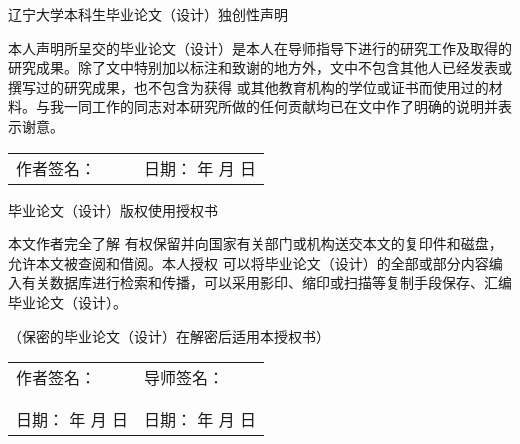 {
  \setlength{\parindent}{0em}
  \linespread{1}

  \vspace*{0.6em}

  {
    \centering
    \songti\xiaoer
    辽宁大学本科生毕业论文（设计）独创性声明 \par
  }

  \vspace{3.1em}

  {
    \setlength{\parindent}{2em}
    \linespread{1.6}
    \songti\xiaosi
    本人声明所呈交的毕业论文（设计）是本人在导师指导下进行的研究工作及取得的研究成果。除了文中特别加以标注和致谢的地方外，文中不包含其他人已经发表或撰写过的研究成果，也不包含为获得 \underline{\kaiti\sihao\bfseries {}} 或其他教育机构的学位或证书而使用过的材料。与我一同工作的同志对本研究所做的任何贡献均已在文中作了明确的说明并表示谢意。 \par
  }

  \vspace{2.9em}

  {
    \songti\xiaosi
    \begin{tabular}{@{} p{0.5\linewidth} p{0.5\linewidth} @{}}
    作者签名： & 日期： \hspace{4em} 年 \hspace{2em} 月 \hspace{2em} 日 \\
    \end{tabular} \par
  }

  \vspace{4.85em}

  {
    \centering
    \songti\xiaoer
    毕业论文（设计）版权使用授权书 \par
  }

  \vspace{2.2em}

  {
    \setlength{\parindent}{2em}
    \linespread{1.6}
    \songti\xiaosi
    本文作者完全了解 \underline{\kaiti\sihao\bfseries {}} 有权保留并向国家有关部门或机构送交本文的复印件和磁盘，允许本文被查阅和借阅。本人授权 \underline{\kaiti\sihao\bfseries {}} 可以将毕业论文（设计）的全部或部分内容编入有关数据库进行检索和传播，可以采用影印、缩印或扫描等复制手段保存、汇编毕业论文（设计）。

    （保密的毕业论文（设计）在解密后适用本授权书） \par
  }

  \vspace{2.9em}

  {
    \songti\xiaosi
    \begin{tabular}{@{} p{0.5\linewidth} p{0.5\linewidth} @{}}
    作者签名： & 导师签名： \\
     & \\
     & \\
    日期： \hspace{4em} 年 \hspace{2em} 月 \hspace{2em} 日 & 日期： \hspace{4em} 年 \hspace{2em} 月 \hspace{2em} 日 \\
    \end{tabular} \par
  }
}

